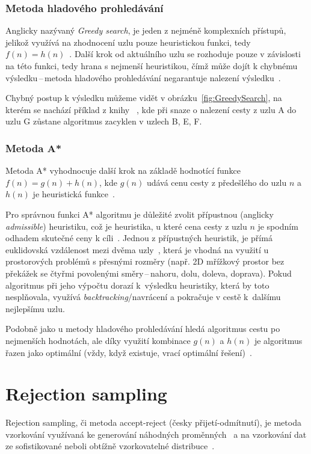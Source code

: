 \subsubsection*{\textbullet Metoda hladového prohledávání}
Anglicky nazývaný \textit{Greedy search}, je jeden z nejméně komplexních přístupů, jelikož využívá na zhodnocení uzlu pouze heuristickou funkci, tedy ${f(n) = h(n)}$~\cite{AI-Modern_approach}. Další krok od aktuálního uzlu se rozhoduje pouze v závislosti na této funkci, tedy hrana s nejmenší heuristikou, čímž může dojít k chybnému výsledku\,--\,metoda hladového prohledávání negarantuje nalezení výsledku~\cite{poole2023artificial}. 

Chybný postup k výsledku můžeme vidět v obrázku~\ref{fig:GreedySearch}, na kterém se nachází příklad z knihy ~\cite{poole2023artificial}, kde při snaze o nalezení cesty z uzlu A do uzlu G zůstane algoritmus zacyklen v uzlech B, E, F.

\subsubsection*{\textbullet Metoda A*}
Metoda A* vyhodnocuje další krok na základě hodnotící funkce ${f(n) = g(n) + h(n)}$, kde ${g(n)}$ udává cenu cesty z předešlého do uzlu ${n}$ a ${h(n)}$ je heuristická funkce~\cite{AI-Modern_approach}. 

Pro správnou funkci A* algoritmu je důležité zvolit přípustnou (anglicky \textit{admissible}) heuristiku, což je heuristika, u které cena cesty z uzlu ${n}$ je spodním odhadem skutečné ceny k cíli~\cite{AI-Modern_approach, izu}. Jednou z přípustných heuristik, je přímá euklidovská vzdálenost mezi dvěma uzly~\cite{poole2023artificial}, která je vhodná na využití u prostorových problémů s přesnými rozměry (např. 2D mřížkový prostor bez překážek se čtyřmi povolenými směry\,--\,nahoru, dolu, doleva, doprava). Pokud algoritmus při jeho výpočtu dorazí k~výsledku heuristiky, která by toto nesplňovala, využívá \textit{backtracking}/navrácení a pokračuje v cestě k~dalšímu nejlepšímu uzlu.

Podobně jako u metody hladového prohledávání hledá algoritmus cestu po nejmenších hodnotách, ale díky využití kombinace ${g(n)}$ a ${h(n)}$ je algoritmus řazen jako optimální (vždy, když existuje, vrací optimální řešení)~\cite{poole2023artificial}.
    
\section{Rejection sampling}
Rejection sampling, či metoda accept-reject (česky přijetí-odmítnutí), je metoda vzorkování využívaná ke generování náhodných proměnných~\cite{thomopoulos2012essentials} a na vzorkování dat ze sofistikované neboli obtížně vzorkovatelné distribuce~\cite{Sachdeva_2021}.

